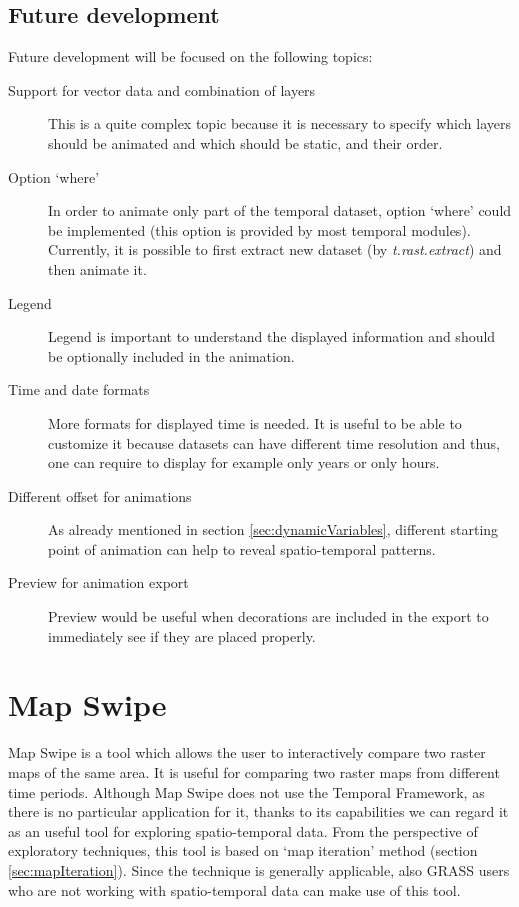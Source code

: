 \documentclass[a4paper,12pt,oneside]{book}
\newcommand{\module}[1]{\textsl{#1}}
\newcommand{\tf}{Temporal Framework\xspace}
\newcommand{\ms}{Map Swipe\xspace}
\begin{document}
\subsection{Future development}
Future development will be focused on the following topics:
\begin{description}
  \item [Support for vector data and combination of layers]
  This is a quite complex topic because it is necessary to specify which layers should be animated and
  which should be static, and their order.
  \item [Option `where'] In order to animate only part of the temporal dataset,
  option `where' could be implemented (this option is provided by most temporal modules).
  Currently, it is possible to first extract new dataset (by \module{t.rast.extract})
  and then animate it.
  
  \item [Legend] Legend is important to understand the displayed information and
  should be optionally included in the animation.
  \item [Time and date formats] More formats for displayed time is needed.
  It is useful to be able to customize it because datasets can have different
  time resolution and thus, one can require to display for example only years or only hours.

  \item [Different offset for animations] As already mentioned in section \ref{sec:dynamicVariables},
  different starting point of animation can help to reveal spatio-temporal patterns.

  \item [Preview for animation export] Preview would be useful when decorations are included in the export
  to immediately see if they are placed properly.
  
\end{description}





\section{\ms}
\ms is a tool which allows the user to interactively compare two raster maps of the same area.
It is useful for comparing two raster maps from different time periods.
Although \ms does not use the \tf, as there is no particular application for it,
thanks to its capabilities we can regard it as an useful tool for exploring spatio-temporal data.
From the perspective of exploratory techniques,
this tool is based on `map iteration' method (section \ref{sec:mapIteration}).
Since the technique is generally applicable, also GRASS users who are not working with
spatio-temporal data can make use of this tool.
\end{document}
